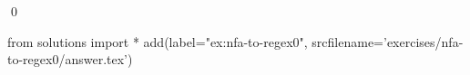 
\begin{ex} 
  \label{ex:nfa-to-regex0}
  
  \qed
\end{ex} 
\begin{python0}
from solutions import *
add(label="ex:nfa-to-regex0",
    srcfilename='exercises/nfa-to-regex0/answer.tex') 
\end{python0}
